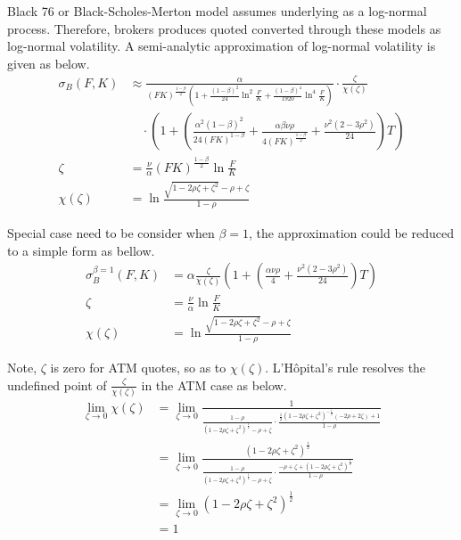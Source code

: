 \documentclass{article}
\begin{document}
Black 76 or Black-Scholes-Merton model assumes underlying as a log-normal process.
Therefore, brokers produces quoted converted through these models as log-normal volatility.
A semi-analytic approximation of log-normal volatility is given as below.
\begin{subequations}
    \begin{align}
        \sigma_B{(F, K)} &\approx \frac{\alpha}{(FK)^{\frac{1 - \beta}{2}}\left(1 + \frac{\left(1 - \beta\right)^2}{24} \ln^2{\frac{F}{K}} + \frac{{\left(1 - \beta\right)}^{4}}{1920} \ln^4{\frac{F}{K}}\right)} \cdot \frac{\zeta}{\chi (\zeta)} \nonumber \\
        & \quad \cdot \left(1 + \left(\frac{\alpha^2 {\left(1 - \beta\right)}^{2}}{24 \left(F K\right)^{1 - \beta}} + \frac{\alpha \beta \nu \rho}{4 {\left(F K\right)}^{\frac{1 - \beta}{2}}} + \frac{\nu^2 \left(2 - 3 \rho^2\right)}{24}\right) T\right)\\
        \zeta &= \frac{\nu}{\alpha} {(F K)}^{\frac{1 - \beta}{2}} \ln{\frac{F}{K}} \\
        \chi(\zeta) &= \ln{\frac{\sqrt{1 - 2 \rho \zeta + {\zeta}^2} - \rho + \zeta}{1 - \rho}}
    \end{align}
\end{subequations}

Special case need to be consider when $ \beta = 1 $, the approximation could be reduced to a simple form as bellow.
\begin{subequations} \label{SABR_LogNormal_Beta_1}
    \begin{align}
        \sigma_B^{\beta = 1}{(F, K)} &= \alpha \frac{\zeta}{\chi(\zeta)} \left(1 + \left(\frac{\alpha \nu \rho}{4} + \frac{\nu^2 \left(2 - 3 \rho^2\right)}{24}\right) T \right) \\
        \zeta &= \frac{\nu}{\alpha} \ln{\frac{F}{K}} \\
        \chi(\zeta) &= \ln{\frac{\sqrt{1 - 2 \rho \zeta + \zeta^2} - \rho + \zeta}{1 - \rho}}
    \end{align}
\end{subequations}

Note, $ \zeta $ is zero for ATM quotes, so as to $ \chi(\zeta) $.
L'H\^opital's rule resolves the undefined point of $ \frac{\zeta}{\chi(\zeta)} $ in the ATM case as below.
\begin{align}
    \lim_{\zeta \to 0}{\chi(\zeta)} &= \lim_{\zeta \to 0}{\frac{1}{\frac{1 - \rho}{\left(1 - 2 \rho \zeta + \zeta^2\right)^{\frac{1}{2}} - \rho + \zeta} \cdot \frac{\frac{1}{2}\left(1 - 2 \rho \zeta + \zeta^2\right)^{-\frac{1}{2}}\left(-2\rho + 2 \zeta \right) + 1}{1 - \rho}}} \nonumber \\
    &= \lim_{\zeta \to 0}{\frac{\left(1 - 2 \rho \zeta + \zeta^2\right)^{\frac{1}{2}}}{\frac{1 - \rho}{\left(1 - 2 \rho \zeta + \zeta^2\right)^{\frac{1}{2}} - \rho + \zeta} \cdot \frac{-\rho + \zeta + \left(1 - 2 \rho \zeta + \zeta^2\right)^{\frac{1}{2}}}{1 - \rho}}} \nonumber \\
    &= \lim_{\zeta \to 0}{\left(1 - 2 \rho \zeta + \zeta^2\right)^{\frac{1}{2}}} \nonumber \\
    &= 1
\end{align}
\end{document}
